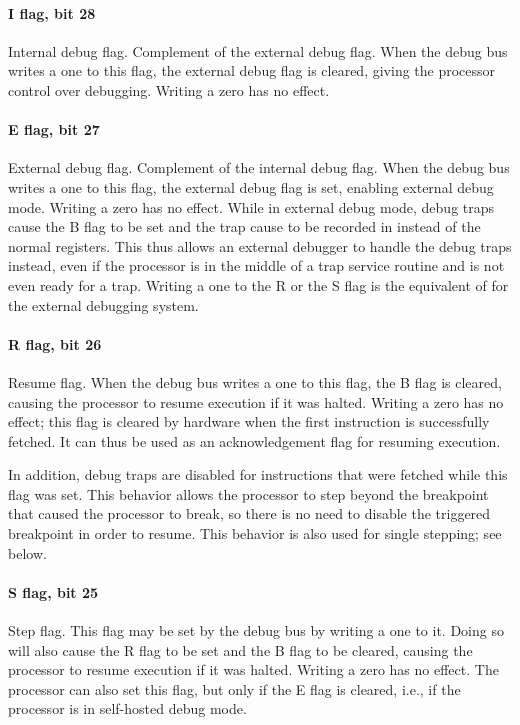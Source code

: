 \paragraph*{I flag, bit 28}
Internal debug flag. Complement of the external debug flag. When the debug bus
writes a one to this flag, the external debug flag is cleared, giving the
processor control over debugging. Writing a zero has no effect.
\paragraph*{E flag, bit 27}
External debug flag. Complement of the internal debug flag. When the debug bus
writes a one to this flag, the external debug flag is set, enabling external
debug mode. Writing a zero has no effect. While in external debug mode, debug
traps cause the B flag to be set and the trap cause to be recorded in 
instead of the normal registers. This thus allows an external debugger to handle
the debug traps instead, even if the processor is in the middle of a trap
service routine and is not even ready for a trap. Writing a one to the R or the
S flag is the equivalent of  for the external debugging system.
\paragraph*{R flag, bit 26}
Resume flag. When the debug bus writes a one to this flag, the B flag is
cleared, causing the processor to resume execution if it was halted. Writing a
zero has no effect; this flag is cleared by hardware when the first instruction
is successfully fetched. It can thus be used as an acknowledgement flag for
resuming execution.

In addition, debug traps are disabled for instructions that were fetched while
this flag was set. This behavior allows the processor to step beyond the
breakpoint that caused the processor to break, so there is no need to disable
the triggered breakpoint in order to resume. This behavior is also used for
single stepping; see below.
\paragraph*{S flag, bit 25}
Step flag. This flag may be set by the debug bus by writing a one to it. Doing
so will also cause the R flag to be set and the B flag to be cleared, causing
the processor to resume execution if it was halted. Writing a zero has no
effect. The processor can also set this flag, but only if the E flag is cleared,
i.e., if the processor is in self-hosted debug mode.

